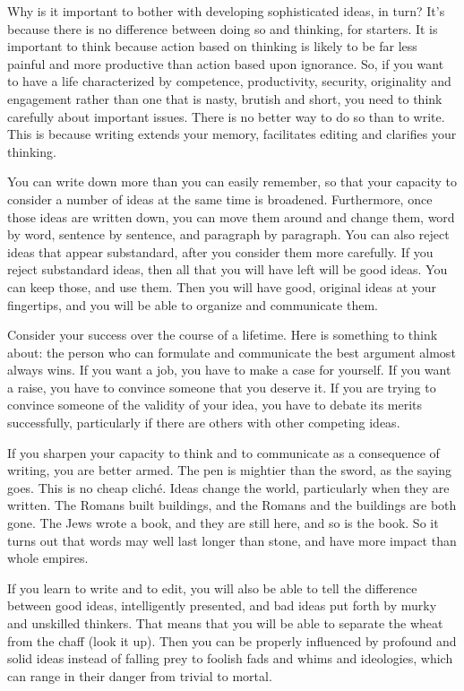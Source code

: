 \documentclass{article}
\begin{document}
Why is it important to bother with developing sophisticated ideas, in
turn? It's because there is no difference between doing so and thinking,
for starters. It is important to think because action based on thinking
is likely to be far less painful and more productive than action based
upon ignorance. So, if you want to have a life characterized by
competence, productivity, security, originality and engagement rather
than one that is nasty, brutish and short, you need to think carefully
about important issues. There is no better way to do so than to write.
This is because writing extends your memory, facilitates editing and
clarifies your thinking.

You can write down more than you can easily remember, so that your
capacity to consider a number of ideas at the same time is broadened.
Furthermore, once those ideas are written down, you can move them around
and change them, word by word, sentence by sentence, and paragraph by
paragraph. You can also reject ideas that appear substandard, after you
consider them more carefully. If you reject substandard ideas, then all
that you will have left will be good ideas. You can keep those, and use
them. Then you will have good, original ideas at your fingertips, and
you will be able to organize and communicate them.

Consider your success over the course of a lifetime. Here is something
to think about: the person who can formulate and communicate the best
argument almost always wins. If you want a job, you have to make a case
for yourself. If you want a raise, you have to convince someone that you
deserve it. If you are trying to convince someone of the validity of
your idea, you have to debate its merits successfully, particularly if
there are others with other competing ideas.

If you sharpen your capacity to think and to communicate as a
consequence of writing, you are better armed. The pen is mightier than
the sword, as the saying goes. This is no cheap cliché. Ideas change the
world, particularly when they are written. The Romans built buildings,
and the Romans and the buildings are both gone. The Jews wrote a book,
and they are still here, and so is the book. So it turns out that words
may well last longer than stone, and have more impact than whole
empires.

If you learn to write and to edit, you will also be able to tell the
difference between good ideas, intelligently presented, and bad ideas
put forth by murky and unskilled thinkers. That means that you will be
able to separate the wheat from the chaff (look it up). Then you can be
properly influenced by profound and solid ideas instead of falling prey
to foolish fads and whims and ideologies, which can range in their
danger from trivial to mortal.
\end{document}

